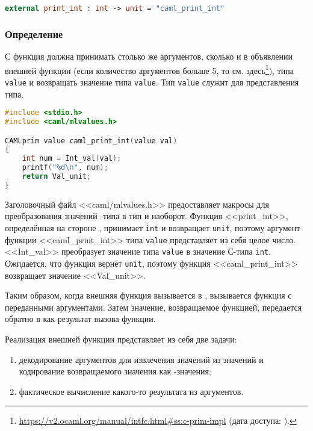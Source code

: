 \begin{lstlisting}[caption={Пример объявления внешней функции <<print\_int>>, которая ссылается на функцию, определённую в С, с именем <<caml\_print\_int>>.},language=Caml, frame=single]
external print_int : int -> unit = "caml_print_int"
\end{lstlisting}

\subsubsection{Определение}

С функция должна принимать столько же аргументов, сколько и в объявлении внешней функции (если количество аргументов больше 5, то см. здесь\footnote{\url{https://v2.ocaml.org/manual/intfc.html\#ss:c-prim-impl} (дата доступа:   ).}), типа \texttt{value} и возвращать значение типа \texttt{value}. Тип \texttt{value} служит для представления \OCaml{} типа.

\begin{lstlisting}[caption={Содержимое файла C с определением функции <<caml\_print\_int>>.}, language=C, frame=single]
#include <stdio.h>
#include <caml/mlvalues.h>

CAMLprim value caml_print_int(value val)
{
    int num = Int_val(val);
    printf("%d\n", num);
    return Val_unit;
}
\end{lstlisting}

Заголовочный файл <<caml/mlvalues.h>> предоставляет макросы для преобразования значений \OCaml{}-типа в тип \C{} и наоборот. Функция <<print\_int>>, определённая на стороне \OCaml{}, принимает \texttt{int} и возвращает \texttt{unit}, поэтому аргумент функции <<caml\_\-pri\-nt\-\_int>> типа \texttt{value} представляет из себя целое число. <<Int\_val>> преобразует значение типа \texttt{value} в значение С-типа \texttt{int}. Ожидается, что функция вернёт \texttt{unit}, поэтому функция <<caml\_\-pri\-nt\-\_int>> возвращает значение <<Val\_unit>>.

Таким образом, когда внешняя функция вызывается в \OCaml{}, вызывается функция \C{} с переданными аргументами. Затем значение, возвращаемое функцией, передается обратно в \OCaml{} как результат вызова функции.

Реализация внешней функции представляет из себя две задачи:
\begin{enumerate}
	\item декодирование аргументов для извлечения значений \C{} из значений \OCaml{} и кодирование возвращаемого значения как \OCaml{}-значения;
	\item фактическое вычисление какого-то результата из аргументов.
\end{enumerate}

